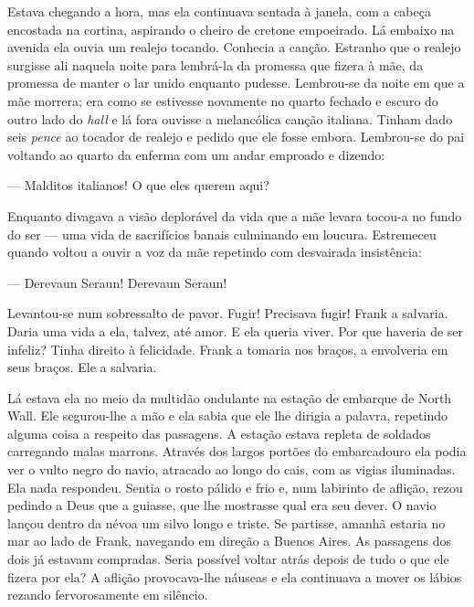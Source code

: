 Estava chegando a hora, mas ela continuava sentada à janela, com a cabeça
encostada na cortina, aspirando o cheiro de cretone empoeirado.  Lá embaixo na
avenida ela ouvia um realejo tocando.  Conhecia a canção.  Estranho que o
realejo surgisse ali naquela noite para lembrá-la da promessa que fizera à mãe,
da promessa de manter o lar unido enquanto pudesse.  Lembrou-se da noite em que
a mãe morrera; era como se estivesse novamente no quarto fechado e escuro do
outro lado do \textit{hall} e lá fora ouvisse a melancólica canção italiana.
Tinham dado seis \textit{pence} ao tocador de realejo e pedido que ele fosse
embora.  Lembrou-se do pai voltando ao quarto da enferma com um andar emproado
e dizendo:

--- Malditos italianos!  O que eles querem aqui?

Enquanto divagava a visão deplorável da vida que a mãe levara tocou-a no fundo
do ser --- uma vida de sacrifícios banais culminando em loucura.  Estremeceu
quando voltou a ouvir a voz da mãe repetindo com desvairada insistência:

--- Derevaun Seraun! Derevaun Seraun!

Levantou-se num sobressalto de pavor.  Fugir!  Precisava fugir!  Frank a
salvaria.  Daria uma vida a ela, talvez, até amor.  E ela queria viver.  Por
que haveria de ser infeliz?  Tinha direito à felicidade.  Frank a tomaria nos
braços, a envolveria em seus braços.  Ele a salvaria.

\smallskip

\noindent\dotfill

\smallskip

Lá estava ela no meio da multidão ondulante na estação de embarque de North
Wall.  Ele segurou-lhe a mão e ela sabia que ele lhe dirigia a palavra,
repetindo alguma coisa a respeito das passagens.  A estação estava repleta de
soldados carregando malas marrons.  Através dos largos portões do embarcadouro
ela podia ver o vulto negro do navio, atracado ao longo do cais, com as vigias
iluminadas.  Ela nada respondeu.  Sentia o rosto pálido e frio e, num labirinto
de aflição, rezou pedindo a Deus que a guiasse, que lhe mostrasse qual era seu
dever.  O navio lançou dentro da névoa um silvo longo e triste.  Se partisse,
amanhã estaria no mar ao lado de Frank, navegando em direção a Buenos Aires.
As passagens dos dois já estavam compradas.  Seria possível voltar atrás depois
de tudo o que ele fizera por ela?  A aflição provocava-lhe náuseas e ela
continuava a mover os lábios rezando fervorosamente em silêncio.

